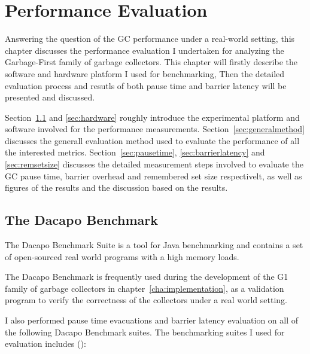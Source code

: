 \chapter{Performance Evaluation}
\label{cha:evaluation}

Answering the question of the GC performance under a real-world setting,
this chapter discusses the performance evaluation I undertaken for analyzing
the Garbage-First family of garbage collectors. This chapter will firstly describe the software and hardware platform I used for benchmarking,
Then the detailed evaluation process and resutls of both pause time and
barrier latency will be presented and discussed.

Section~\ref{sec:dacapo} and \ref{sec:hardware} roughly introduce the experimental
platform and software involved for the performance measurements.
Section~\ref{sec:generalmethod} discusses the generall evaluation method used to
evaluate the performance of all the interested metrics.
Section~\ref{sec:pausetime}, \ref{sec:barrierlatency} and \ref{sec:remsetsize} discusses the detailed
measurement steps involved to evaluate the GC pause time, barrier overhead and remembered set size
respectivelt, as well
as figures of the results and the discussion based on the results.

\section{The Dacapo Benchmark} %
\label{sec:dacapo}

The Dacapo Benchmark Suite is a tool for Java benchmarking and contains a set of
open-sourced real world programs with a high memory loads.

The Dacapo Benchmark is frequently used during the development of the G1 family
of garbage collectors in chapter~\ref{cha:implementation}, as a validation program
to verify the correctness of the collectors under a real world setting.

I also performed pause time evacuations and barrier latency evaluation
on all of the following Dacapo Benchmark suites.
The benchmarking suites I used for evaluation includes (\cite{Blackburn:2006:DBJ:1167515.1167488}):


